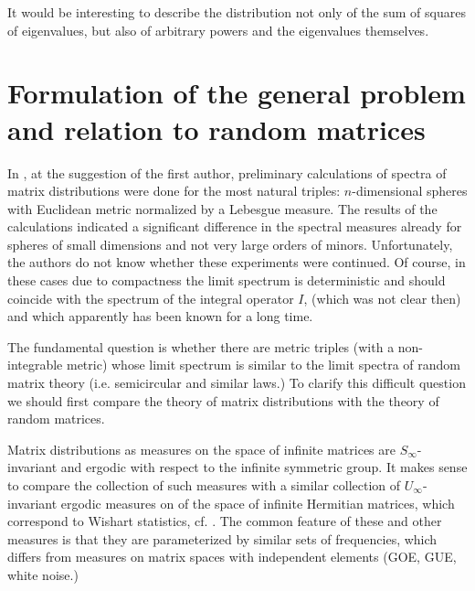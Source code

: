\documentclass[11pt]{article}
\begin{document}
It would be interesting to describe the distribution not only of the sum of squares
of eigenvalues, but also of arbitrary powers and the eigenvalues themselves.

\section{Formulation of the general problem and relation to random matrices}


In \cite{Bog}, at the suggestion of the first author, preliminary calculations of spectra of matrix distributions were done
for the most natural triples: $n$-dimensional spheres with Euclidean metric normalized by a Lebesgue measure. 
The results of the calculations indicated a significant difference in the spectral measures already for spheres of small dimensions and not very large orders of minors.
Unfortunately, the authors do not know whether these experiments were continued. Of course, in these cases
due to compactness the limit spectrum is deterministic and should coincide with the spectrum of the integral operator $I$, (which was not clear then) and which apparently has been known for a long time.


The fundamental question is whether there are metric triples (with a non-integrable metric)
whose limit spectrum is similar to the limit spectra of random matrix theory (i.e. semicircular and similar laws.) To clarify this difficult question we should first
compare the theory of matrix distributions with the theory of random matrices.


 
 Matrix distributions as measures on the space of infinite matrices are $S_{\infty}$-invariant and ergodic with respect to the infinite symmetric group. It makes sense to compare the collection of such measures with a similar 
 collection of $U_{\infty}$-invariant ergodic measures on
 of the space of infinite Hermitian matrices, 
 which correspond to Wishart statistics, cf. \cite{Pic, OV, VPEMJ}.
 The common feature of these and other measures is that they are parameterized by similar sets of frequencies, which differs from measures on matrix spaces with independent elements (GOE, GUE, white noise.)
\end{document}
